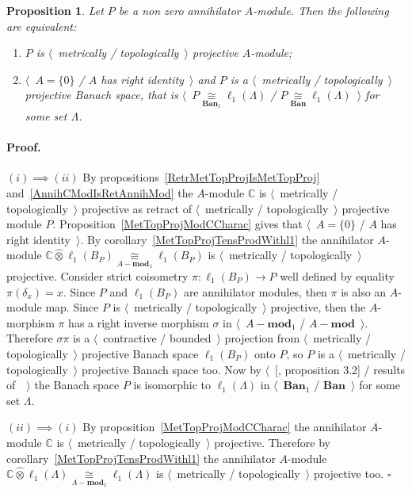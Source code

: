 \documentclass[12pt]{article}
\newcommand{\projtens}{\mathbin{\widehat{\otimes}}}
\newcommand{\isom}[1]{\mathop{\mathbin{\cong}}\limits_{#1}}
\newtheorem{proposition}[theorem]{Proposition}
\renewenvironment{proof}{\paragraph{Proof.}}{\hfill$\square$\medskip}
\begin{document}
\begin{proposition}\label{MetTopProjOfAnnihModCharac} Let $P$ be a non zero
    annihilator $A$-module. Then the following are equivalent:
    \begin{enumerate}[label = (\roman*)]
        \item $P$ is $\langle$~metrically / topologically~$\rangle$ projective
              $A$-module;

        \item $\langle$~$A=\{0\}$ / $A$ has right identity~$\rangle$ and $P$ is
              a $\langle$~metrically / topologically~$\rangle$ projective Banach
              space, that is $\langle$~$P\isom{\mathbf{Ban}_1}\ell_1(\Lambda)$ /
              $P\isom{\mathbf{Ban}}\ell_1(\Lambda)$~$\rangle$ for some set
              $\Lambda$.
    \end{enumerate}
\end{proposition}
\begin{proof} $(i) \implies (ii)$ By
    propositions~\ref{RetrMetTopProjIsMetTopProj}
    and~\ref{AnnihCModIsRetAnnihMod} the $A$-module $\mathbb{C}$ is
    $\langle$~metrically / topologically~$\rangle$ projective as retract of
    $\langle$~metrically / topologically~$\rangle$ projective module $P$.
    Proposition~\ref{MetTopProjModCCharac} gives that $\langle$~$A=\{0\}$ / $A$
    has right identity~$\rangle$.  By corollary~\ref{MetTopProjTensProdWithl1}
    the annihilator $A$-module
    $\mathbb{C}\projtens\ell_1(B_P)\isom{A-\mathbf{mod}_1}\ell_1(B_P)$ is
    $\langle$~metrically / topologically~$\rangle$ projective. Consider strict
    coisometry $\pi:\ell_1(B_P)\to P$ well defined by equality
    $\pi(\delta_x)=x$. Since $P$ and $\ell_1(B_P)$ are annihilator modules, then
    $\pi$ is also an $A$-module map. Since $P$ is $\langle$~metrically /
    topologically~$\rangle$ projective, then the $A$-morphism $\pi$ has a right
    inverse morphism $\sigma$ in $\langle$~$A-\mathbf{mod}_1$ / $A-\mathbf{mod}$~$\rangle$.
    Therefore $\sigma\pi$ is a $\langle$~contractive / bounded~$\rangle$
    projection from $\langle$~metrically / topologically~$\rangle$ projective
    Banach space $\ell_1(B_P)$ onto $P$, so $P$ is a $\langle$~metrically /
    topologically~$\rangle$ projective Banach space too. Now by
    $\langle$~[\cite{HelMetrFrQMod}, proposition 3.2] / results
    of~\cite{KotheTopProjBanSp}~$\rangle$ the Banach space $P$ is isomorphic to
    $\ell_1(\Lambda)$ in $\langle$~$\mathbf{Ban}_1$ / $\mathbf{Ban}$~$\rangle$
    for some set $\Lambda$.

    $(ii) \implies (i)$ By proposition~\ref{MetTopProjModCCharac} the
    annihilator $A$-module $\mathbb{C}$ is $\langle$~metrically /
    topologically~$\rangle$ projective. Therefore by
    corollary~\ref{MetTopProjTensProdWithl1} the annihilator $A$-module
    $\mathbb{C}\projtens\ell_1(\Lambda)\isom{A-\mathbf{mod}_1}\ell_1(\Lambda)$ is
    $\langle$~metrically / topologically~$\rangle$ projective too.
\end{proof}
\end{document}
